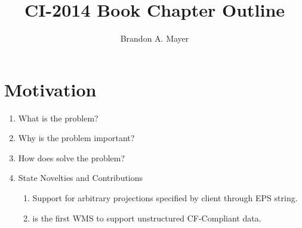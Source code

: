 \documentclass{article}
\author{Brandon A. Mayer}
\title{\sciwms{} CI-2014 Book Chapter Outline}
\date{}
\begin{document}
\maketitle

\section{Motivation}
\begin{enumerate}
  \item What is the problem?
  \item Why is the problem important?
  \item How does \sciwms{} solve the problem?
  \item State Novelties and Contributions
    \begin{enumerate}[label*=\arabic*.]
      \item Support for arbitrary projections specified by client through EPS string.
      \item \sciwms{} is the first WMS to support unstructured CF-Compliant data.
    \end{enumerate}
\end{enumerate}
\end{document}
